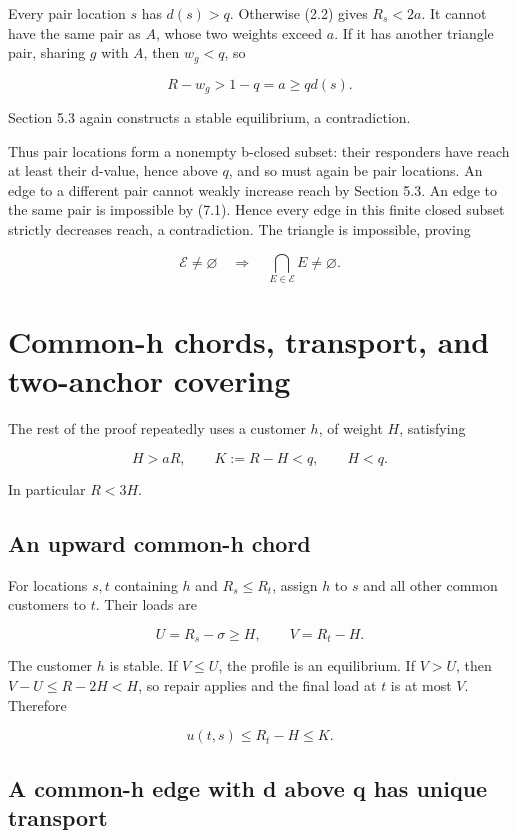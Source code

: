 \documentclass[11pt,a4paper]{article}
\begin{document}
Every pair location \(s\) has \(d(s)>q\). Otherwise (2.2) gives \(R_s<2a\). It cannot have the same pair as \(A\), whose two weights exceed \(a\). If it has another triangle pair, sharing \(g\) with \(A\), then \(w_g<q\), so

\[
R-w_g>1-q=a\ge qd(s).
\]

Section 5.3 again constructs a stable equilibrium, a contradiction.

Thus pair locations form a nonempty b-closed subset: their responders have reach at least their d-value, hence above \(q\), and so must again be pair locations. An edge to a different pair cannot weakly increase reach by Section 5.3. An edge to the same pair is impossible by (7.1). Hence every edge in this finite closed subset strictly decreases reach, a contradiction. The triangle is impossible, proving

\[
\mathcal E\ne\varnothing\quad\Longrightarrow\quad\bigcap_{E\in\mathcal E}E\ne\varnothing. \tag{8.1}
\]

\hypertarget{common-h-chords-transport-and-two-anchor-covering}{%
\section{Common-h chords, transport, and two-anchor covering}\label{common-h-chords-transport-and-two-anchor-covering}}

The rest of the proof repeatedly uses a customer \(h\), of weight \(H\), satisfying

\[
H>aR,\qquad K:=R-H<q,\qquad H<q. \tag{9.1}
\]

In particular \(R<3H\).

\hypertarget{an-upward-common-h-chord}{%
\subsection{An upward common-h chord}\label{an-upward-common-h-chord}}

For locations \(s,t\) containing \(h\) and \(R_s\le R_t\), assign \(h\) to \(s\) and all other common customers to \(t\). Their loads are

\[
U=R_s-\sigma\ge H,\qquad V=R_t-H.
\]

The customer \(h\) is stable. If \(V\le U\), the profile is an equilibrium. If \(V>U\), then \(V-U\le R-2H<H\), so repair applies and the final load at \(t\) is at most \(V\). Therefore

\[
u(t,s)\le R_t-H\le K. \tag{9.2}
\]

\hypertarget{a-common-h-edge-with-d-above-q-has-unique-transport}{%
\subsection{A common-h edge with d above q has unique transport}\label{a-common-h-edge-with-d-above-q-has-unique-transport}}
\end{document}
